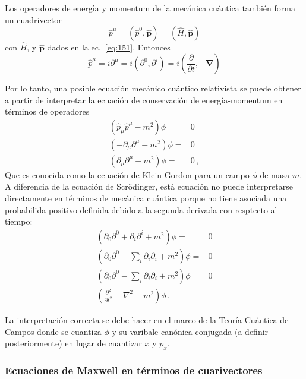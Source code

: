 \begin{frame}
Los operadores de energ\'\i a y momentum de la mec\'anica cu\'antica tambi\'en forma un cuadrivector
\begin{equation}
  \hat p^\mu=({\hat p}^0,\hat{\mathbf{p}})=(\widehat H,\hat{\mathbf{p}})
\end{equation}
con $\widehat H$, y $\hat{\mathbf{p}}$ dados en la ec.~\eqref{eq:151}. Entonces
\begin{equation}
  \label{eq:cv_hatpmu}
  \hat{p}^\mu=i\partial^\mu=i(\partial^0,\partial^i)=i(\frac{\partial}{\partial t},-\boldsymbol{\nabla})
\end{equation}

Por lo tanto, una posible ecuación mecánico cuántico relativista se puede obtener a partir de interpretar la ecuación de conservación de energía-momentum en términos de operadores
\begin{align}
  \label{eq:KG}
\left(\hat{p}_\mu  \hat{p}^\mu -m^2  \right)\phi=&0 \nonumber\\
  \left(-\partial_{\mu}\partial^{\mu} -m^2  \right)\phi=&0 \nonumber\\
  \left(\partial_{\mu}\partial^{\mu} +m^2  \right)\phi=&0 \,,
\end{align}
Que es conocida como la ecuación de Klein-Gordon para un campo $\phi$ de masa $m$. A diferencia de la ecuación de Scr\"odinger, está ecuación no puede interpretarse directamente en términos de mecánica cuántica porque no tiene asociada una probabilida positivo-definida debido a la segunda derivada con resptecto al tiempo:
\begin{align}
  \left(\partial_0\partial^0+\partial_i\partial^i +m^2  \right)\phi=&0 \nonumber\\
  \left(\partial_0\partial^0-\sum_i\partial_i\partial_i +m^2  \right)\phi=&0 \nonumber\\
  \left(\partial_0\partial^0-\sum_i\partial_i\partial_i +m^2  \right)\phi=&0 \nonumber\\
\left(   \frac{\partial^2}{\partial t^2}-\nabla^2+m^2  \right)\phi\,.
\end{align}

La interpretación correcta se debe hacer en el marco de la Teoría Cuántica de Campos donde se cuantiza $\phi$ y su varibale canónica conjugada (a definir posteriormente) en lugar de cuantizar $x$ y $p_x$.
\end{frame}



\subsubsection{Ecuaciones de Maxwell en términos de cuarivectores}

